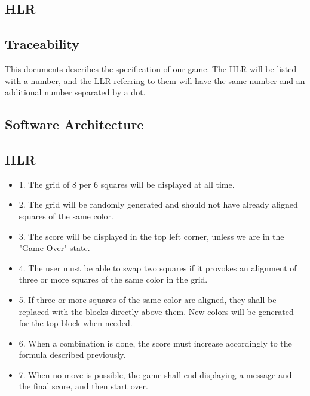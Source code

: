 
\subsection{HLR}

\subsection{Traceability}

This documents describes the specification of our game. The HLR will be listed
with a number, and the LLR referring to them will have the same number and an
additional number separated by a dot.

\subsection{Software Architecture}

\subsection{HLR}

\begin{itemize}
    \item 1. The grid of 8 per 6 squares will be displayed at all time.
    \item 2. The grid will be randomly generated and should not have already
        aligned squares of the same color.
    \item 3. The score will be displayed in the top left corner, unless we are
        in the "Game Over" state.
    \item 4. The user must be able to swap two squares if it provokes an alignment
        of three or more squares of the same color in the grid.
    \item 5. If three or more squares of the same color are aligned, they shall be
        replaced with the blocks directly above them. New colors will be
        generated for the top block when needed.
    \item 6. When a combination is done, the score must increase accordingly to the
        formula described previously.
    \item 7. When no move is possible, the game shall end displaying a message and
        the final score, and then start over.
\end{itemize}

